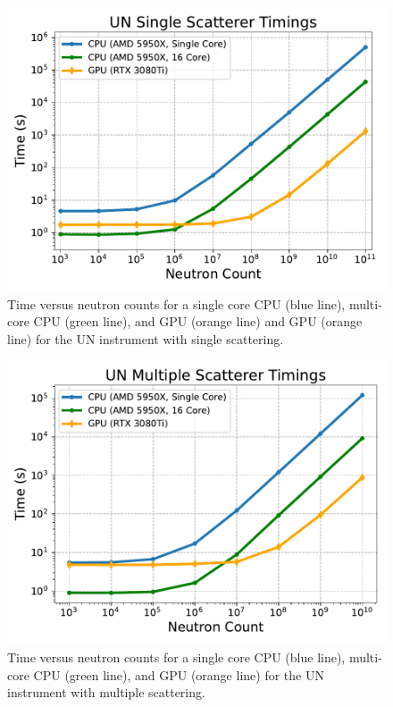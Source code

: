 \begin{figure}[h]
    \centering
    \includegraphics[width=\columnwidth]{figures/mcvine_un_ss_timings.pdf}
    \caption{Time versus neutron counts for a single core CPU (blue line), multi-core CPU (green line), and GPU (orange line) and GPU (orange line) for the UN instrument with single scattering.}
    \label{fig:results_ss}
\end{figure}

\begin{figure}[h]
    \centering
    \includegraphics[width=\columnwidth]{figures/mcvine_un_ms_timings.pdf}
    \caption{Time versus neutron counts for a single core CPU (blue line), multi-core CPU (green line), and GPU (orange line) for the UN instrument with multiple scattering.}
    \label{fig:results_ms}
\end{figure}


